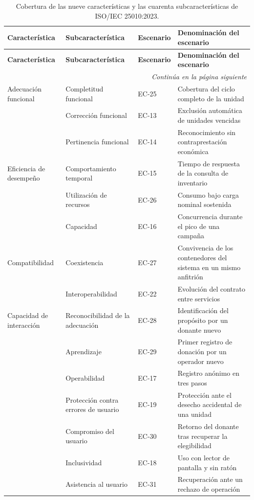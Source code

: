 \documentclass[11pt,a4paper]{article}
\newcommand{\contlinea}[1]{\multicolumn{#1}{r}{\footnotesize\itshape Continúa en la página siguiente}}
\begin{document}
\begin{longtable}{L{3.4cm} L{4.4cm} L{2.0cm} L{4.4cm}}
\caption{Cobertura de las nueve características y las cuarenta subcaracterísticas de ISO/IEC 25010:2023.}\label{tab:coberturacal}\\
\toprule
\textbf{Característica} & \textbf{Subcaracterística} & \textbf{Escenario} & \textbf{Denominación del escenario} \\
\midrule
\endfirsthead
\toprule
\textbf{Característica} & \textbf{Subcaracterística} & \textbf{Escenario} & \textbf{Denominación del escenario} \\
\midrule
\endhead
\midrule
\contlinea{4} \\
\endfoot
\bottomrule
\endlastfoot
Adecuación funcional & Completitud funcional & EC-25 & Cobertura del ciclo completo de la unidad \\
 & Corrección funcional & EC-13 & Exclusión automática de unidades vencidas \\
 & Pertinencia funcional & EC-14 & Reconocimiento sin contraprestación económica \\
\midrule
Eficiencia de desempeño & Comportamiento temporal & EC-15 & Tiempo de respuesta de la consulta de inventario \\
 & Utilización de recursos & EC-26 & Consumo bajo carga nominal sostenida \\
 & Capacidad & EC-16 & Concurrencia durante el pico de una campaña \\
\midrule
Compatibilidad & Coexistencia & EC-27 & Convivencia de los contenedores del sistema en un mismo anfitrión \\
 & Interoperabilidad & EC-22 & Evolución del contrato entre servicios \\
\midrule
Capacidad de interacción & Reconocibilidad de la adecuación & EC-28 & Identificación del propósito por un donante nuevo \\
 & Aprendizaje & EC-29 & Primer registro de donación por un operador nuevo \\
 & Operabilidad & EC-17 & Registro anónimo en tres pasos \\
 & Protección contra errores de usuario & EC-19 & Protección ante el desecho accidental de una unidad \\
 & Compromiso del usuario & EC-30 & Retorno del donante tras recuperar la elegibilidad \\
 & Inclusividad & EC-18 & Uso con lector de pantalla y sin ratón \\
 & Asistencia al usuario & EC-31 & Recuperación ante un rechazo de operación \\

\end{longtable}
\end{document}
